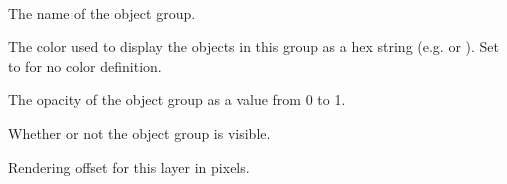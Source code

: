 \documentclass[letterpaper,10pt,english]{sphinxmanual}
\begin{document}
\begin{fulllineitems}
\label{index:tmx.ObjectGroup}~

\begin{fulllineitems}
\label{index:tmx.ObjectGroup.name}
The name of the object group.

\end{fulllineitems}


\begin{fulllineitems}
\label{index:tmx.ObjectGroup.color}
The color used to display the objects in this group as a hex
string (e.g.  or ).  Set to
 for no color definition.

\end{fulllineitems}


\begin{fulllineitems}
\label{index:tmx.ObjectGroup.opacity}
The opacity of the object group as a value from 0 to 1.

\end{fulllineitems}


\begin{fulllineitems}
\label{index:tmx.ObjectGroup.visible}
Whether or not the object group is visible.

\end{fulllineitems}


\begin{fulllineitems}
\label{index:tmx.ObjectGroup.offsetx}
Rendering offset for this layer in pixels.

\end{fulllineitems}



\end{fulllineitems}
\end{document}
